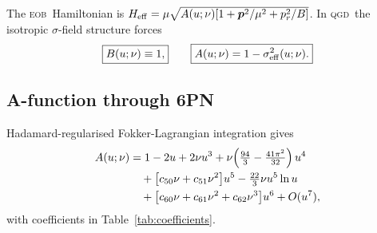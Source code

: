 \documentclass[twocolumn,aps,prd,showpacs,superscriptaddress,floatfix]{revtex4-2}
\newcommand{\sigeq}{\sigma_{\rm eff}^2}
\newcommand{\QGD}{\textsc{qgd}}
\newcommand{\EOB}{\textsc{eob}}
\begin{document}
The \EOB\ Hamiltonian is
$H_{\rm eff}=\mu\sqrt{A(u;\nu)[1+\bm p^2/\mu^2+p_r^2/B]}$.
In \QGD\ the isotropic $\sigma$-field structure forces
\begin{equation}
  \boxed{B(u;\nu)\equiv1,} \qquad
  \boxed{A(u;\nu)=1-\sigeq(u;\nu).}
\end{equation}

\subsection{A-function through 6PN}

Hadamard-regularised Fokker-Lagrangian integration gives
\begin{align}
  A(u;\nu) &= 1-2u+2\nu u^3
    +\nu\!\left(\tfrac{94}{3}-\tfrac{41\pi^2}{32}\right)u^4 \notag\\
  &\quad+\bigl[c_{50}\nu+c_{51}\nu^2\bigr]u^5
    -\tfrac{22}{3}\nu u^5\ln u \notag\\
  &\quad+\bigl[c_{60}\nu+c_{61}\nu^2+c_{62}\nu^3\bigr]u^6
    +O(u^7),
  \label{eq:Afull}
\end{align}
with coefficients in Table~\ref{tab:coefficients}.
\end{document}
